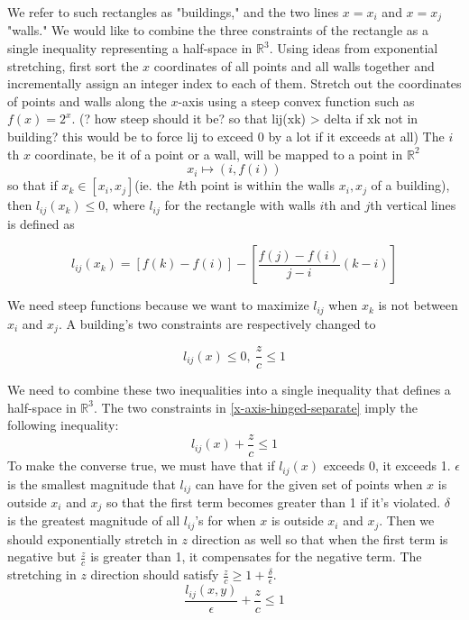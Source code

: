\documentclass{NSF}
\begin{document}
We refer to such rectangles as "buildings," and the two lines $x=x_i$ and $x=x_j$ "walls."
We would like to combine the three constraints of the rectangle as a single inequality representing a half-space in $\mathbb{R}^3$.
Using ideas from exponential stretching, first sort the $x$ coordinates of all points and all walls together and incrementally assign an integer index to each of them. Stretch out the coordinates of points and walls along the $x$-axis using a steep convex function such as $f(x)=2^x$. 
(? how steep should it be? so that lij(xk) > delta if xk not in building? this would be to force lij to exceed 0 by a lot if it exceeds at all)
The $i$th $x$ coordinate, be it of a point or a wall, will be mapped to a point in $\mathbb{R}^2$
\begin{equation}
	x_i \mapsto (i, f(i))
\end{equation}
so that if $x_k \in [x_i,x_j]$(ie. the $k$th point is within the walls $x_i,x_j$ of a building), then $l_{ij}(x_k) \leq 0 $, where $l_{ij}$ for the rectangle with walls  $i$th and $j$th vertical lines is defined as

\begin{equation*}
    l_{ij}(x_k) = [f(k) - f(i)] -[\frac{f(j)-f(i)}{j-i}(k - i)]
\end{equation*}


We need steep functions because we want to maximize $l_{ij}$ when $x_k$ is not between $x_i$ and $x_j$.
A building's two constraints are respectively changed to 

\begin{equation}\label{x-axis-hinged-separate}
    l_{ij}(x) \leq 0, \ \frac{z}{c} \leq 1
\end{equation}


We need to combine these two inequalities into a single inequality that defines a half-space in $\mathbb{R}^3$. 
The two constraints in \eqref{x-axis-hinged-separate} imply the following inequality:
\begin{equation}\label{x-axis-hinged-added}
    l_{ij}(x) + \frac{z}{c} \leq 1 
\end{equation}
To make the converse true, we must have that if $l_{ij}(x)$ exceeds 0, it exceeds 1. $\epsilon$ is the smallest magnitude that $l_{ij}$ can have for the given set of points when $x$ is outside $x_i$ and $x_j$ so that the first term becomes greater than 1 if it's violated. $\delta$ is the greatest magnitude of all $l_{ij}$'s for when $x$ is outside $x_i$ and $x_j$. Then we should exponentially stretch in $z$ direction as well so that when the first term is negative but $\frac{z}{c}$ is greater than 1, it compensates for the negative term. The stretching in $z$ direction should satisfy $\frac{z}{c} \geq 1+\frac{\delta}{\epsilon}$.
\begin{equation}
	\frac{l_{ij}(x,y)}{\epsilon} + \frac{z}{c} \leq 1
\end{equation}
\end{document}

